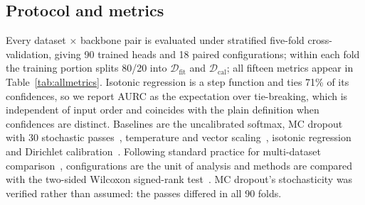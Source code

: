 \documentclass[conference]{IEEEtran}
\begin{document}
\subsection{Protocol and metrics}
Every dataset $\times$ backbone pair is evaluated under stratified five-fold
cross-validation, giving 90 trained heads and 18 paired configurations; within each
fold the training portion splits 80/20 into $\mathcal{D}_{\mathrm{fit}}$ and
$\mathcal{D}_{\mathrm{cal}}$; all fifteen metrics appear in
Table~\ref{tab:allmetrics}. Isotonic regression is a step function and ties 71\%
of its confidences, so we report AURC as the expectation over tie-breaking, which
is independent of input order and coincides with the plain definition when
confidences are distinct. Baselines are the uncalibrated softmax, MC dropout
with 30 stochastic passes~\cite{gal2016dropout}, temperature and vector
scaling~\cite{guo2017calibration}, isotonic
regression~\cite{zadrozny2002transforming} and Dirichlet
calibration~\cite{kull2019beyond}. Following standard practice for multi-dataset
comparison~\cite{demsar2006statistical}, configurations are the unit of analysis
and methods are compared with the two-sided Wilcoxon signed-rank
test~\cite{wilcoxon1945individual}. MC dropout's stochasticity was verified rather
than assumed: the passes differed in all 90 folds.
\end{document}
